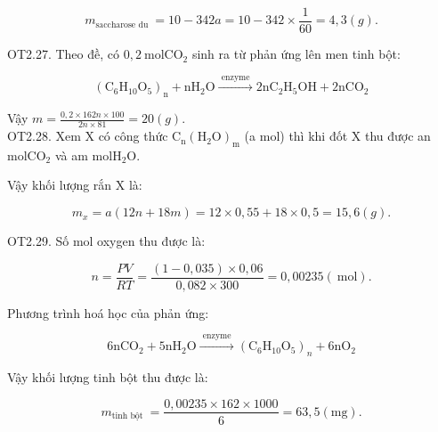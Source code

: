 \documentclass[10pt]{article}
\begin{document}
$$
m_{\text {saccharose du }}=10-342 a=10-342 \times \frac{1}{60}=4,3(g) .
$$

OT2.27. Theo đề, có $0,2 \mathrm{~mol} \mathrm{CO}_{2}$ sinh ra từ phản ứng lên men tinh bột:

$$
\left(\mathrm{C}_{6} \mathrm{H}_{10} \mathrm{O}_{5}\right)_{\mathrm{n}}+\mathrm{nH}_{2} \mathrm{O} \xrightarrow{\text { enzyme }} 2 \mathrm{nC}_{2} \mathrm{H}_{5} \mathrm{OH}+2 \mathrm{nCO}_{2}
$$

Vậy $m=\frac{0,2 \times 162 n \times 100}{2 n \times 81}=20(g)$.\\
OT2.28. Xem X có công thức $\mathrm{C}_{\mathrm{n}}\left(\mathrm{H}_{2} \mathrm{O}\right)_{\mathrm{m}}$ (a mol) thì khi đốt X thu được an $\mathrm{mol} \mathrm{CO}_{2}$ và am $\mathrm{mol} \mathrm{H}_{2} \mathrm{O}$.

Vậy khối lượng rắn X là:

$$
m_{x}=a(12 n+18 m)=12 \times 0,55+18 \times 0,5=15,6(g) .
$$

OT2.29. Số mol oxygen thu được là:

$$
n=\frac{P V}{R T}=\frac{(1-0,035) \times 0,06}{0,082 \times 300}=0,00235(\mathrm{~mol}) .
$$

Phương trình hoá học của phản ứng:

$$
6 \mathrm{nCO}_{2}+5 \mathrm{nH}_{2} \mathrm{O} \xrightarrow{\text { enzyme }}\left(\mathrm{C}_{6} \mathrm{H}_{10} \mathrm{O}_{5}\right)_{n}+6 \mathrm{nO}_{2}
$$

Vậy khối lượng tinh bột thu được là:

$$
m_{\text {tinh bột }}=\frac{0,00235 \times 162 \times 1000}{6}=63,5(\mathrm{mg}) .
$$
\end{document}
